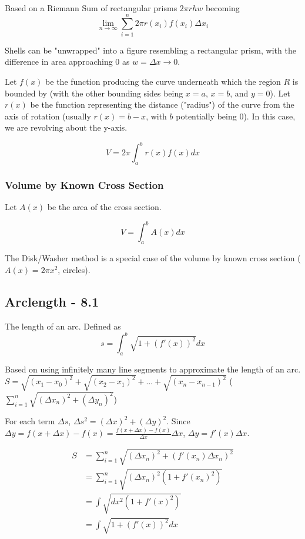 \documentclass{article}
\begin{document}
Based on a Riemann Sum of rectangular prisms $2 \pi rhw$ becoming
$$\lim_{n \to \infty} \sum_{i=1}^{n} 2 \pi r(x_i) f(x_i) \Delta x_i$$

Shells can be "unwrapped" into a figure resembling a rectangular prism, with the difference in area approaching $0$ as $w = \Delta x \to 0$.

Let $f(x)$ be the function producing the curve underneath which the region $R$ is bounded by (with the other bounding sides being $x = a$, $x = b$, and $y = 0$). Let $r(x)$ be the function representing the distance ("radius") of the curve from the axis of rotation (usually $r(x) = b - x$, with $b$ potentially being $0$). In this case, we are revolving about the y-axis.

$$V = 2\pi \int_{a}^{b} r(x)f(x) dx$$

\subsubsection{Volume by Known Cross Section}
Let $A(x)$ be the area of the cross section.

$$V = \int_{a}^{b} A(x)dx$$

The Disk/Washer method is a special case of the volume by known cross section ($A(x) = 2\pi x^2$, circles).

\subsection{Arclength - 8.1}
The length of an arc. Defined as
$$ s = \int_{a}^{b} \sqrt{1+(f'(x))^2} dx$$

Based on using infinitely many line segments to approximate the length of an arc.
$S = \sqrt{(x_1-x_0)^2} + \sqrt{(x_2-x_1)^2} + ... + \sqrt{(x_n-x_{n-1})^2}$ ($\sum_{i=1}^n \sqrt{(\Delta x_n)^2 + (\Delta y_n)^2}$)

For each term $\Delta s$, $\Delta s^2 = (\Delta x)^2 + (\Delta y)^2$.
Since  $\Delta y = f(x + \Delta x) - f(x) = \frac{f(x + \Delta x) - f(x)}{\Delta x}\Delta x$, $\Delta y = f'(x)\Delta x$.

\begin{align*}
    S & = \sum_{i=1}^n \sqrt{(\Delta x_n)^2 + (f'(x_n)\Delta x_n)^2} \\
      & = \sum_{i=1}^n \sqrt{(\Delta x_n)^2(1 + f'(x_n)^2)} \\
      & = \int \sqrt{dx^2(1 + f'(x)^2)} \\
      & = \int \sqrt{1 + (f'(x))^2} dx
\end{align*}
\end{document}
